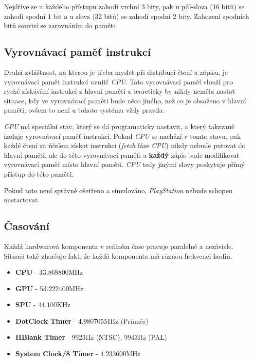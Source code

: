 Nejdříve se u každého přístupu zahodí vrchní 3 bity, pak u půl-slova (16 bitů) se zahodí spodní 1 bit a u slova (32 bitů) se zahodí spodní 2 bity.
Zahození spodních bitů souvisí se zarovnáním do paměti.

\subsection{Vyrovnávací paměť instrukcí}

Druhá zvláštnost, na kterou je třeba myslet při distribuci čtení a zápisu, je vyrovnávací pamět instrukcí
uvnitř \textit{CPU}. Tato vyrovnávací paměť slouží pro ryché získávání instrukcí z hlavní paměti a
teoreticky by nikdy neměla nastat situace, kdy ve vyrovnávací paměti bude něco jiného, než co je
obsaženo v hlavní paměti, ovšem to není u tohoto systému vždy pravda.

\textit{CPU} má speciální stav, který se dá programaticky nastavit, a který takzvaně izoluje vyrovnávací paměť instrukcí.
Pokud \textit{CPU} se nachází v tomto stavu, pak každé čtení za účelem získat instrukci (\textit{fetch} fáze \textit{CPU}) nikdy nebude putovat
do hlavní paměti, ale do této vyrovnávací paměti a \textbf{každý} zápis bude modifikovat vyrovnávací paměť místo hlavní paměti.
\textit{CPU} tedy jinými slovy poskytuje přímý přístup do této paměti.

Pokud toto není správně ošetřeno a simulováno, \textit{PlayStation} nebude schopen nastartovat.

\subsection{Časování}

Každá hardwarová komponenta v reálném čase pracuje paralelně a nezávisle. Situaci také zhoršuje fakt,
že každá komponenta má různou frekvenci hodin.

\begin{itemize}
    \label{Rychlost hodin komponent}
    \item{\textbf{CPU} - 33.868800MHz}
    \item{\textbf{GPU} - 53.222400MHz}
    \item{\textbf{SPU} - 44.100KHz}
    \item{\textbf{DotClock Timer} - 4.980705MHz (Průměr)}
    \item{\textbf{HBlank Timer} - 9923Hz (NTSC), 9943Hz (PAL)}
    \item{\textbf{System Clock/8 Timer} - 4.233600MHz}
\end{itemize}

